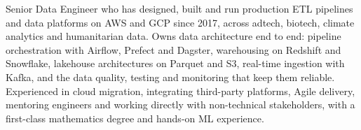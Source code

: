 
\begin{cvparagraph}

Senior Data Engineer who has designed, built and run production ETL pipelines and data platforms on AWS and GCP since 2017, across adtech, biotech, climate analytics and humanitarian data. Owns data architecture end to end: pipeline orchestration with Airflow, Prefect and Dagster, warehousing on Redshift and Snowflake, lakehouse architectures on Parquet and S3, real-time ingestion with Kafka, and the data quality, testing and monitoring that keep them reliable. Experienced in cloud migration, integrating third-party platforms, Agile delivery, mentoring engineers and working directly with non-technical stakeholders, with a first-class mathematics degree and hands-on ML experience.

\end{cvparagraph}
